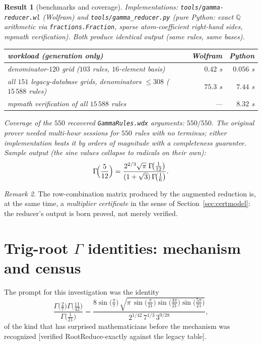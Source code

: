 \documentclass[11pt]{article}
\newtheorem{result}{Result}[section]
\theoremstyle{remark}
\newtheorem{remark}[result]{Remark}
\newcommand{\dps}[1]{\textsf{\footnotesize[#1]}}
\begin{document}
\begin{result}[benchmarks and coverage]\label{res:bench}
Implementations: \texttt{tools/gamma-reducer.wl} (Wolfram) and
\texttt{tools/gamma\_reducer.py} (pure Python: exact $\mathbb{Q}$ arithmetic via
\texttt{fractions.Fraction}, sparse atom-coefficient right-hand sides, mpmath
verification). Both produce \emph{identical} output (same rules, same bases).

\begin{center}
\begin{tabular}{l r r}
\toprule
workload (generation only) & Wolfram & Python\\
\midrule
denominator-$120$ grid ($103$ rules, $16$-element basis) & $0.42$ s & $0.056$ s\\
all $151$ legacy-database grids, denominators $\le308$ ($15\,588$ rules) & $75.3$ s & $7.44$ s\\
mpmath verification of all $15\,588$ rules & --- & $8.32$ s\\
\bottomrule
\end{tabular}
\end{center}

Coverage of the $550$ recovered \texttt{GammaRules.wdx} arguments: $550/550$. The original
prover needed multi-hour sessions for $550$ rules with no terminus; either implementation
beats it by orders of magnitude \emph{with} a completeness guarantee. Sample output (the
sine values collapse to radicals on their own):
\[
\Gamma\!\Bigl(\frac{5}{12}\Bigr)
=\frac{2^{2/3}\sqrt{\pi}\;\Gamma\!\bigl(\tfrac1{12}\bigr)}
{(1+\sqrt3)\,\Gamma\!\bigl(\tfrac16\bigr)} .
\]
\end{result}

\begin{remark}
The row-combination matrix produced by the augmented reduction is, at the same time, a
\emph{multiplier certificate} in the sense of Section~\ref{sec:certmodel}: the reducer's
output is born proved, not merely verified.
\end{remark}

\section{Trig-root \texorpdfstring{$\Gamma$}{Gamma} identities: mechanism and census}
\label{sec:trigroot}

The prompt for this investigation was the identity
\[
\frac{\Gamma\bigl(\tfrac27\bigr)\Gamma\bigl(\tfrac{11}{42}\bigr)}{\Gamma\bigl(\tfrac1{21}\bigr)}
=\frac{8\sin\bigl(\tfrac{\pi}{7}\bigr)\,
\sqrt{\pi\,\sin\bigl(\tfrac{\pi}{21}\bigr)\sin\bigl(\tfrac{4\pi}{21}\bigr)
\sin\bigl(\tfrac{5\pi}{21}\bigr)}}
{2^{1/42}\,7^{1/3}\,3^{9/28}},
\]
of the kind that has surprised mathematicians before the mechanism was recognized
\dps{verified RootReduce-exactly against the legacy table}.
\end{document}
